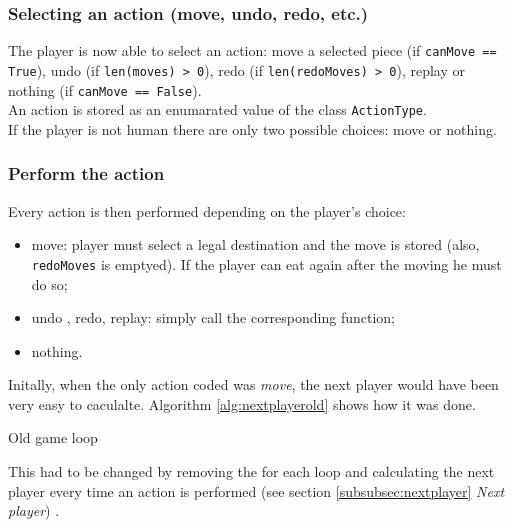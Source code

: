 \documentclass[10pt, a4paper]{article}
\begin{document}
	\subsubsection{Selecting an action (move, undo, redo, etc.)}
	The player is now able to select an action: move a selected piece (if \texttt{canMove == True}), undo (if \texttt{len(moves) > 0}), redo (if \texttt{len(redoMoves) > 0}), replay or nothing (if \texttt{canMove == False}).\\
	An action is stored as an enumarated value of the class \texttt{ActionType}.\\
	If the player is not human there are only two possible choices: move or nothing.
	
	\subsubsection{Perform the action}
	Every action is then performed depending on the player's choice:
	\begin{itemize}
		\item move: player must select a legal destination and the move is stored (also, \texttt{redoMoves} is emptyed). If the player can eat again after the moving he must do so;
		\item undo , redo, replay: simply call the corresponding function;
		\item nothing.
	\end{itemize}
	Initally, when the only action coded was \textit{move}, the next player would have been very easy to caculalte. Algorithm \ref{alg:nextplayerold} shows how it was done.
	\begin{algorithm}[h]
		\label{alg:nextplayerold}
		\caption{Old game loop}
	\end{algorithm}
	This had to be changed by removing the for each loop and calculating the next player every time an action is performed (see section \ref{subsubsec:nextplayer} \textit{Next player}) .
	
\end{document}
